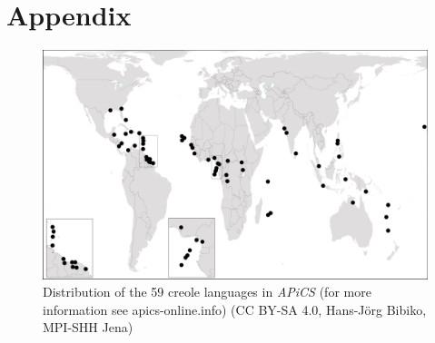 \documentclass[output=paper]{langsci/langscibook}
\begin{document}
 
\section*{Appendix}
\begin{figure}[h!]
\includegraphics[width=\textwidth]{figures/Michaelis-Fig1.png}
\caption{Distribution of the 59 creole languages in \textit{APiCS} (for more information see apics-online.info) (CC BY-SA 4.0, Hans-Jörg Bibiko, MPI-SHH Jena)}
\label{fig:michaelis:1}
\end{figure}

\sloppy
\printbibliography[heading=subbibliography,notkeyword=this] 
\end{document}
